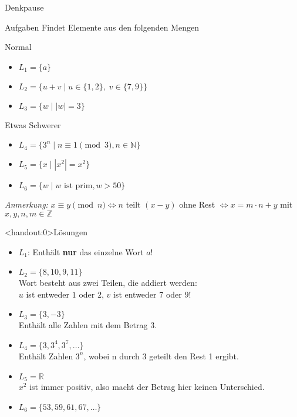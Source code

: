 {
\begin{frame}[fragile]{Denkpause}
    \footnotesize
        \begin{alertblock}{Aufgaben}
            Findet Elemente aus den folgenden Mengen
        \end{alertblock}
        \begin{block}{Normal}
            \begin{itemize}
                \item $L_1 = \{a\}$
                \item $L_2 = \{u+v \mid u\in\{1,2\},\;v\in\{7,9\}\}$
                \item $L_3 = \{w \mid |w| = 3\}$
            \end{itemize}
        \end{block}
        \begin{block}{Etwas Schwerer}
            \begin{itemize}
                \item $L_4 = \{3^n \mid n \equiv 1 \pmod 3, n\in\mathbb{N}\}$
                \item $L_5 = \{x \mid |x^2| = x^2\}$
                \item $L_6 = \{w \mid w \text{ ist prim}, w > 50\}$
            \end{itemize}
        \end{block}
        \emph{Anmerkung:} $x \equiv y \pmod n \iff n$ teilt $(x-y)$ ohne Rest $\iff x = m \cdot n + y$ mit $x,y,n,m \in \mathbb{Z}$
\end{frame}
}

{
\begin{frame}<handout:0>{Lösungen}
  \begin{itemize}[<+- | alert@+>]
        \item 
            $L_1$: Enthält \textbf{nur} das einzelne Wort $a$!
        \item
            $L_2 = \{8, 10, 9, 11\}$\\
            Wort besteht aus zwei Teilen, die addiert werden:\\ $u$ ist entweder $1$ oder $2$, $v$ ist entweder $7$ oder $9$!
        \item
            $L_3 = \{3, -3\}$\\
            Enthält alle Zahlen mit dem Betrag $3$.
        \item
        $L_4 = \{3, 3^4, 3^7, \dots\}$\\
            Enthält Zahlen $3^n$, wobei n durch 3 geteilt den Rest 1 ergibt.
        \item
            $L_5 = \mathbb{R}$\\
            $x^2$ ist immer positiv, also macht der Betrag hier keinen Unterschied.
        \item
            $L_6 = \{53, 59, 61, 67, \dots\}$
    \end{itemize}
\end{frame}
}
